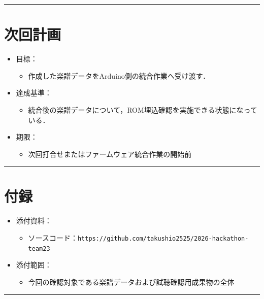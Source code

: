 \documentclass[uplatex,dvipdfmx,a4paper,11pt]{jsarticle}
\newcommand{\sectionrule}{\par\medskip\noindent\rule{\linewidth}{0.6pt}\par\medskip}
\begin{document}
\sectionrule

\section{次回計画}

\begin{itemize}
  \item 目標：
    \begin{itemize}
        \item {}作成した楽譜データをArduino側の統合作業へ受け渡す．
    \end{itemize}
  \item 達成基準：
    \begin{itemize}
      \item {}統合後の楽譜データについて，ROM埋込確認を実施できる状態になっている．
    \end{itemize}
  \item 期限：
    \begin{itemize}
      \item {}次回打合せまたはファームウェア統合作業の開始前
    \end{itemize}
\end{itemize}

\sectionrule


\section{付録}

\begin{itemize}
  \item 添付資料：
    \begin{itemize}
      \item ソースコード：\texttt{https://github.com/takushio2525/2026-hackathon-team23}
    \end{itemize}
  \item 添付範囲：
    \begin{itemize}
      \item 今回の確認対象である楽譜データおよび試聴確認用成果物の全体
    \end{itemize}
\end{itemize}

\sectionrule
\end{document}
